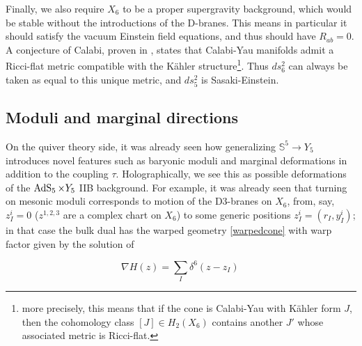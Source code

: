 Finally, we also require $X_6$ to be a proper supergravity background, which would be stable without the introductions of the D-branes. This means in particular it should satisfy the vacuum Einstein field equations, and thus should have $R_{ab} = 0$. A conjecture of Calabi, proven in \cite{YauCalabi}, states that Calabi-Yau manifolds admit a Ricci-flat metric compatible with the K\"ahler structure\footnote{more precisely, this means that if the cone is Calabi-Yau with K\"ahler form $J$, then the cohomology class $[J] \in H_2(X_6)$ contains another $J'$ whose associated metric is Ricci-flat.}. Thus $ds_6^2$ can always be taken as equal to this unique metric, and $ds^2_5$ is Sasaki-Einstein.

%
%
%
%

\subsection{Moduli and marginal directions}

On the quiver theory side, it was already seen how generalizing $\mathbb{S}^5 \rightarrow Y_5$ introduces novel features such as baryonic moduli and marginal deformations in addition to the coupling $\tau$. Holographically, we see this as possible deformations of the $\operatorname{AdS}_{5} \times Y_5$ IIB background. For example, it was already seen that turning on mesonic moduli corresponds to motion of the D3-branes on $X_6$, from, say, $z_I^i = 0$ ($z^{1,2,3}$ are a complex chart on $X_6$) to some generic positions $z_I^i = (r_I, y_I^i)$; in that case the bulk dual has the warped geometry \eqref{warpedcone} with warp factor given by the solution of\cite{MZ}

\begin{equation}
	\nabla H (z) = \sum_I \delta^6(z - z_I)\,
	\label{}
\end{equation}

